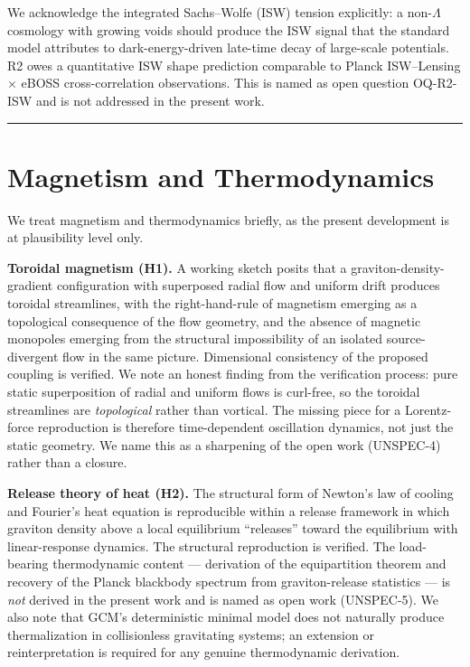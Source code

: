 \documentclass[12pt]{article}
\theoremstyle{definition}
\theoremstyle{remark}
\begin{document}
We acknowledge the integrated Sachs--Wolfe (ISW) tension explicitly: a
non-\(\Lambda\) cosmology with growing voids should produce the ISW
signal that the standard model attributes to dark-energy-driven
late-time decay of large-scale potentials. R2 owes a quantitative ISW
shape prediction comparable to Planck ISW--Lensing × eBOSS
cross-correlation observations. This is named as open question OQ-R2-ISW
and is not addressed in the present work.

\begin{center}\rule{0.5\linewidth}{0.5pt}\end{center}

\section{Magnetism and Thermodynamics}\label{sec:magnetism}

We treat magnetism and thermodynamics briefly, as the present
development is at plausibility level only.

\textbf{Toroidal magnetism (H1).} A working sketch posits that a
graviton-density-gradient configuration with superposed radial flow and
uniform drift produces toroidal streamlines, with the right-hand-rule of
magnetism emerging as a topological consequence of the flow geometry,
and the absence of magnetic monopoles emerging from the structural
impossibility of an isolated source-divergent flow in the same picture.
Dimensional consistency of the proposed coupling is verified. We note an
honest finding from the verification process: pure static superposition
of radial and uniform flows is curl-free, so the toroidal streamlines
are \emph{topological} rather than vortical. The missing piece for a
Lorentz-force reproduction is therefore time-dependent oscillation
dynamics, not just the static geometry. We name this as a sharpening of
the open work (UNSPEC-4) rather than a closure.

\textbf{Release theory of heat (H2).} The structural form of Newton's
law of cooling and Fourier's heat equation is reproducible within a
release framework in which graviton density above a local equilibrium
``releases'' toward the equilibrium with linear-response dynamics. The
structural reproduction is verified. The load-bearing thermodynamic
content --- derivation of the equipartition theorem and recovery of the
Planck blackbody spectrum from graviton-release statistics --- is
\emph{not} derived in the present work and is named as open work
(UNSPEC-5). We also note that GCM's deterministic minimal model does not
naturally produce thermalization in collisionless gravitating systems;
an extension or reinterpretation is required for any genuine
thermodynamic derivation.
\end{document}
